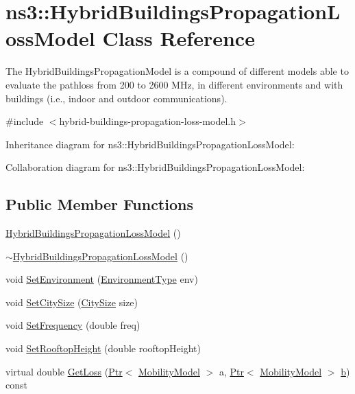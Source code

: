 \hypertarget{classns3_1_1HybridBuildingsPropagationLossModel}{}\section{ns3\+:\+:Hybrid\+Buildings\+Propagation\+Loss\+Model Class Reference}
\label{classns3_1_1HybridBuildingsPropagationLossModel}


The Hybrid\+Buildings\+Propagation\+Model is a compound of different models able to evaluate the pathloss from 200 to 2600 M\+Hz, in different environments and with buildings (i.\+e., indoor and outdoor communications).  




{\ttfamily \#include $<$hybrid-\/buildings-\/propagation-\/loss-\/model.\+h$>$}



Inheritance diagram for ns3\+:\+:Hybrid\+Buildings\+Propagation\+Loss\+Model\+:


Collaboration diagram for ns3\+:\+:Hybrid\+Buildings\+Propagation\+Loss\+Model\+:
\subsection*{Public Member Functions}
\begin{DoxyCompactItemize}
\item 
\hyperlink{classns3_1_1HybridBuildingsPropagationLossModel_aa77da462c4fc1b200a82d617b67e0d79}{Hybrid\+Buildings\+Propagation\+Loss\+Model} ()
\item 
\hyperlink{classns3_1_1HybridBuildingsPropagationLossModel_a06432379fd095e83f6e1138edc0e4686}{$\sim$\+Hybrid\+Buildings\+Propagation\+Loss\+Model} ()
\item 
void \hyperlink{classns3_1_1HybridBuildingsPropagationLossModel_ada6b3db511b64555b4d5c70f2bacc7ea}{Set\+Environment} (\hyperlink{group__propagation_ga0e392ed771a28c92112047e63308a53a}{Environment\+Type} env)
\item 
void \hyperlink{classns3_1_1HybridBuildingsPropagationLossModel_a034e2ef2c24fbb4531c6f9e597fbf573}{Set\+City\+Size} (\hyperlink{group__propagation_ga29c9a1b1a58b6a56054ff5ea4c5a574d}{City\+Size} size)
\item 
void \hyperlink{classns3_1_1HybridBuildingsPropagationLossModel_a5810ee59a316be4e56b6859e3779c40a}{Set\+Frequency} (double freq)
\item 
void \hyperlink{classns3_1_1HybridBuildingsPropagationLossModel_a7f0a86bc369b8c3774e2dbb74e7423f2}{Set\+Rooftop\+Height} (double rooftop\+Height)
\item 
virtual double \hyperlink{classns3_1_1HybridBuildingsPropagationLossModel_a241f98b865eb28321e724c6963ba4f83}{Get\+Loss} (\hyperlink{classns3_1_1Ptr}{Ptr}$<$ \hyperlink{classns3_1_1MobilityModel}{Mobility\+Model} $>$ a, \hyperlink{classns3_1_1Ptr}{Ptr}$<$ \hyperlink{classns3_1_1MobilityModel}{Mobility\+Model} $>$ \hyperlink{lte__pathloss_8m_a21ad0bd836b90d08f4cf640b4c298e7c}{b}) const 
\end{DoxyCompactItemize}
